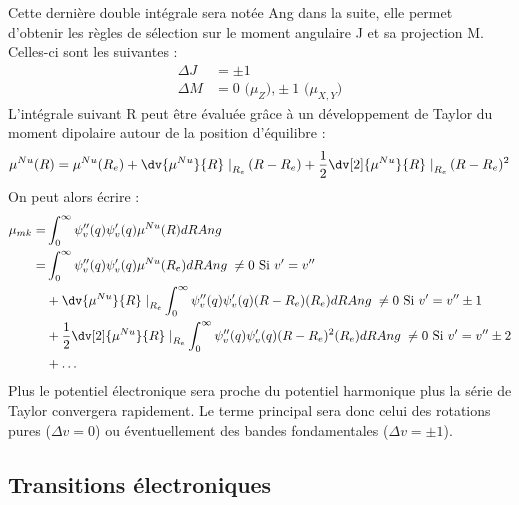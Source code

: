 Cette dernière double intégrale sera notée Ang dans la suite, elle permet d'obtenir les règles de sélection sur le moment angulaire J et sa projection M. Celles-ci sont les suivantes :
\begin{equation*}
    \begin{split}
        \Delta J &= \pm1\\
        \Delta M &= 0 \textrm{ ($\mu_Z$),} \pm1 \textrm{ ($\mu_{X,Y}$)}
    \end{split}
\end{equation*}
L'intégrale suivant R peut être évaluée grâce à un développement de Taylor du moment dipolaire autour de la position d'équilibre :
\begin{equation*}
    \mu^{Nu}(R) = \mu^{Nu}(R_e) + \dv{\mu^{Nu}}{R}\left.\right|_{R_e}(R-R_e) + \frac{1}{2}\dv[2]{\mu^{Nu}}{R}\left.\right|_{R_e}(R-R_e)^2
\end{equation*}
On peut alors écrire : 
\begin{equation*}
    \begin{split}
        \mu_{mk} =& \int^{\infty}_0\psi_v''(q)\psi_v'(q)\mu^{Nu}(R)dRAng\\
         =& \int^{\infty}_0\psi_v''(q)\psi_v'(q)\mu^{Nu}(R_e)dRAng \; \neq 0 \textrm{ Si $v' = v''$}\\
         &+ \dv{\mu^{Nu}}{R}\left.\right|_{R_e}\int^{\infty}_0\psi_v''(q)\psi_v'(q)(R-R_e)(R_e)dRAng \; \neq 0 \textrm{ Si $v' = v''\pm1$}\\
         &+ \frac{1}{2}\dv[2]{\mu^{Nu}}{R}\left.\right|_{R_e}\int^{\infty}_0\psi_v''(q)\psi_v'(q)(R-R_e)^2(R_e)dRAng \; \neq 0 \textrm{ Si $v' = v''\pm2$}\\
         &+ \hdots
    \end{split}
\end{equation*}
Plus le potentiel électronique sera proche du potentiel harmonique plus la série de Taylor convergera rapidement. Le terme principal sera donc celui des rotations pures ($\Delta v = 0$) ou éventuellement des bandes fondamentales ($\Delta v = \pm1$).

\subsection{Transitions électroniques}


